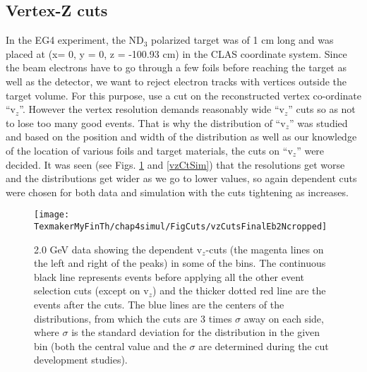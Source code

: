 \subsection{Vertex-Z cuts}
\label{vzCuts}

In the EG4 experiment, the ND$_3$ polarized target was of 1 cm long and was placed at (x= 0, y = 0, z = -100.93 cm) in the CLAS coordinate system. Since the beam electrons have to go through a few foils %
before reaching the target as well as the detector, 
we want to reject electron tracks with vertices 
outside the target volume. %
For this purpose, use a cut on the reconstructed vertex co-ordinate ``v$_z$''. %
However the vertex resolution demands reasonably %
wide ``v$_z$'' cuts so as not to lose too many %
good events. %
That is why the distribution of ``v$_z$'' was %
studied and based on the position and width of the distribution as well as our knowledge of the location of various foils and target materials, the cuts on ``v$_z$'' were decided. %
It was seen (see Figs. \ref{vzCtExp} and \ref{vzCtSim}) that the resolutions get worse and the distributions get wider as we go to lower \qsqs values, so again \qsqs dependent cuts were chosen for both data and simulation with the cuts tightening as \qsq increases.

\begin{figure}[H]%
\centering
\leavevmode \texttt{[image: TexmakerMyFinTh/chap4simul/FigCuts/vzCutsFinalEb2Ncropped]}  %
\caption[v$_z$ cuts (Exp.)]{2.0 GeV data showing the \qsqs dependent v$_z$-cuts (the magenta lines on the left and right of the peaks) in some of the \qsqs bins. The continuous black line represents events before applying all the other event selection cuts (except on v$_z$) and the thicker dotted red line are the events after the cuts. The blue lines are the centers of the distributions, from which the cuts are 3 times $\sigma$ away on each side, where $\sigma$ is the standard deviation for the distribution in the given \qsqs bin (both the central value and the $\sigma$ are determined during the cut development studies).}
\label{vzCtExp}
\end{figure}

